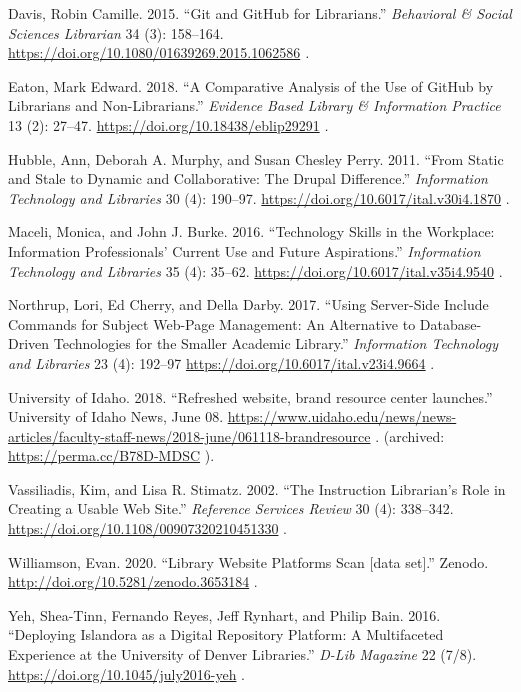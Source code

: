 \documentclass{book}
\begin{document}
Davis, Robin Camille. 2015. ``Git and GitHub for Librarians.''
\emph{Behavioral \& Social Sciences Librarian} 34 (3): 158--164.
\url{https://doi.org/10.1080/01639269.2015.1062586} \emph{.}

Eaton, Mark Edward. 2018. ``A Comparative Analysis of the Use of GitHub by
Librarians and Non-Librarians.'' \emph{Evidence Based Library \& Information
Practice} 13 (2): 27--47. \url{https://doi.org/10.18438/eblip29291} \emph{.}

Hubble, Ann, Deborah A. Murphy, and Susan Chesley Perry. 2011. ``From Static
and Stale to Dynamic and Collaborative: The Drupal Difference.''
\emph{Information Technology and Libraries }30 (4): 190--97.
\url{https://doi.org/10.6017/ital.v30i4.1870} .

Maceli, Monica, and John J. Burke. 2016. ``Technology Skills in the Workplace:
Information Professionals' Current Use and Future Aspirations.''
\emph{Information Technology and Libraries} 35 (4): 35--62.
\url{https://doi.org/10.6017/ital.v35i4.9540} .

Northrup, Lori, Ed Cherry, and Della Darby. 2017. ``Using Server-Side Include
Commands for Subject Web-Page Management: An Alternative to Database-Driven
Technologies for the Smaller Academic Library.'' \emph{Information Technology
and Libraries} 23 (4): 192--97 \url{https://doi.org/10.6017/ital.v23i4.9664} .

University of Idaho. 2018. ``Refreshed website, brand resource center
launches.'' University of Idaho News, June 08.
\url{https://www.uidaho.edu/news/news-articles/faculty-staff-news/2018-june/061118-brandresource}
. (archived: \url{https://perma.cc/B78D-MDSC} ).

Vassiliadis, Kim, and Lisa R. Stimatz. 2002. ``The Instruction Librarian's
Role in Creating a Usable Web Site.'' \emph{Reference Services Review} 30 (4):
338--342. \url{https://doi.org/10.1108/00907320210451330} .

Williamson, Evan. 2020. ``Library Website Platforms Scan {[}data set{]}.''
Zenodo. \url{http://doi.org/10.5281/zenodo.3653184} .

Yeh, Shea-Tinn, Fernando Reyes, Jeff Rynhart, and Philip Bain. 2016.
``Deploying Islandora as a Digital Repository Platform: A Multifaceted
Experience at the University of Denver Libraries.'' \emph{D-Lib Magazine} 22
(7/8). \url{https://doi.org/10.1045/july2016-yeh} .

\backmatter
\end{document}
